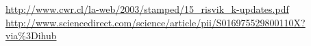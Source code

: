 \documentclass[a4paper, 11pt]{article} %
\begin{document}
	\begin{thebibliography}{9}

		 \url{http://www.cwr.cl/la-web/2003/stamped/15_risvik_k-updates.pdf}
		 \url{http://www.sciencedirect.com/science/article/pii/S016975529800110X?via\%3Dihub}

	\end{thebibliography}
\end{document}
